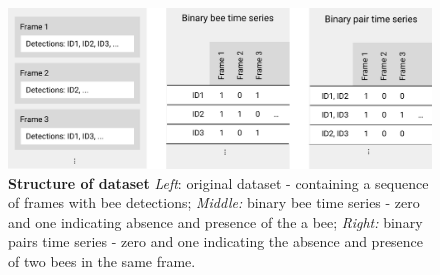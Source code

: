 \begin{figure}[htb]
	\centering
	\includegraphics[width=1.0\textwidth]{Figures/structure}
	\caption[Structure of dataset]{\textbf{Structure of dataset} \emph{Left}: original dataset - containing a sequence of frames with bee detections; \emph{Middle:} binary bee time series - zero and one indicating absence and presence of the a bee; \emph{Right:} binary pairs time series - zero and one indicating the absence and presence of two bees in the same frame.}
	\label{fig:structure}
\end{figure}

